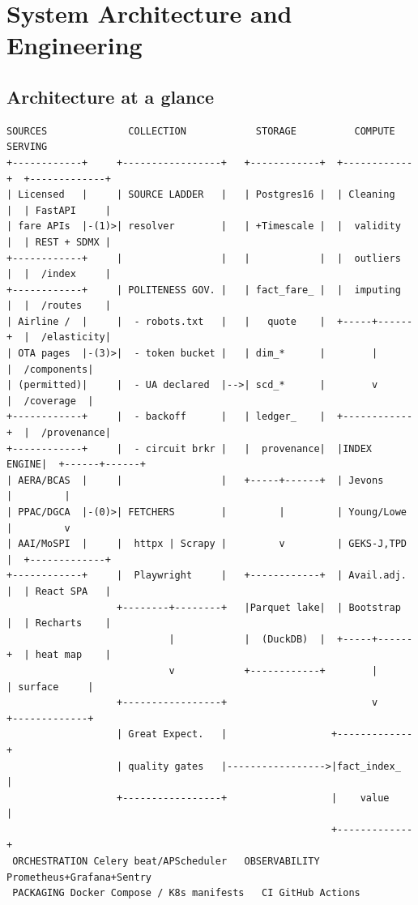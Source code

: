 \chapter{System Architecture and Engineering}

\section{Architecture at a glance}

{\footnotesize
\begin{Verbatim}[frame=single,rulecolor=\color{rulegrey},framesep=5pt,fontsize=\scriptsize]
  SOURCES              COLLECTION            STORAGE          COMPUTE          SERVING
+------------+     +-----------------+   +------------+  +------------+  +-------------+
| Licensed   |     | SOURCE LADDER   |   | Postgres16 |  | Cleaning   |  | FastAPI     |
| fare APIs  |-(1)>| resolver        |   | +Timescale |  |  validity  |  | REST + SDMX |
+------------+     |                 |   |            |  |  outliers  |  |  /index     |
+------------+     | POLITENESS GOV. |   | fact_fare_ |  |  imputing  |  |  /routes    |
| Airline /  |     |  - robots.txt   |   |   quote    |  +-----+------+  |  /elasticity|
| OTA pages  |-(3)>|  - token bucket |   | dim_*      |        |         |  /components|
| (permitted)|     |  - UA declared  |-->| scd_*      |        v         |  /coverage  |
+------------+     |  - backoff      |   | ledger_    |  +------------+  |  /provenance|
+------------+     |  - circuit brkr |   |  provenance|  |INDEX ENGINE|  +------+------+
| AERA/BCAS  |     |                 |   +-----+------+  | Jevons     |         |
| PPAC/DGCA  |-(0)>| FETCHERS        |         |         | Young/Lowe |         v
| AAI/MoSPI  |     |  httpx | Scrapy |         v         | GEKS-J,TPD |  +-------------+
+------------+     |  Playwright     |   +------------+  | Avail.adj. |  | React SPA   |
                   +--------+--------+   |Parquet lake|  | Bootstrap  |  | Recharts    |
                            |            |  (DuckDB)  |  +-----+------+  | heat map    |
                            v            +------------+        |         | surface     |
                   +-----------------+                         v         +-------------+
                   | Great Expect.   |                  +-------------+
                   | quality gates   |----------------->|fact_index_  |
                   +-----------------+                  |    value    |
                                                        +-------------+
 ORCHESTRATION Celery beat/APScheduler   OBSERVABILITY Prometheus+Grafana+Sentry
 PACKAGING Docker Compose / K8s manifests   CI GitHub Actions
\end{Verbatim}
}

